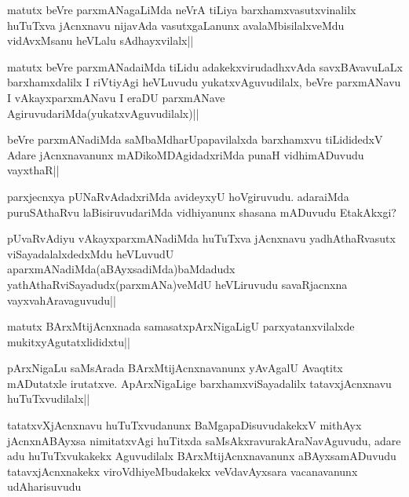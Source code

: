 \begin{artha}
matutx beVre parxmANagaLiMda neVrA tiLiya barxhamxvasutxvinalilx huTuTxva jAcnxnavu nijavAda vasutxgaLanunx avalaMbisilalxveMdu vidAvxMsanu heVLalu sAdhayxvilalx||
\end{artha}


\begin{artha}
matutx beVre parxmANadaiMda tiLidu adakekxvirudadhxvAda savxBAvavuLaLx barxhamxdalilx I riVtiyAgi heVLuvudu yukatxvAguvudilalx, beVre parxmANavu I vAkayxparxmANavu I eraDU parxmANave AgiruvudariMda(yukatxvAguvudilalx)||
\end{artha}

\begin{artha}
beVre parxmANadiMda saMbaMdharUpapavilalxda barxhamxvu tiLididedxV Adare jAcnxnavanunx mADikoMDAgidadxriMda punaH vidhimADuvudu vayxthaR||
\end{artha}


\begin{artha}
parxjecnxya pUNaRvAdadxriMda avideyxyU hoVgiruvudu. adaraiMda puruSAthaRvu laBisiruvudariMda vidhiyanunx shasana mADuvudu EtakAkxgi?
\end{artha}


\begin{artha}
pUvaRvAdiyu vAkayxparxmANadiMda huTuTxva jAcnxnavu yadhAthaRvasutx viSayadalalxdedxMdu heVLuvudU aparxmANadiMda(aBAyxsadiMda)baMdadudx yathAthaRviSayadudx(parxmANa)veMdU heVLiruvudu savaRjacnxna vayxvahAravaguvudu||
\end{artha}


\begin{artha}
matutx BArxMtijAcnxnada samasatxpArxNigaLigU parxyatanxvilalxde mukitxyAgutatxlididxtu||
\end{artha}

\begin{artha}
pArxNigaLu saMsArada BArxMtijAcnxnavanunx yAvAgalU Avaqtitx mADutatxle irutatxve. ApArxNigaLige barxhamxviSayadalilx tatavxjAcnxnavu huTuTxvudilalx||
\end{artha}

\begin{artha}
tatatxvXjAcnxnavu huTuTxvudanunx BaMgapaDisuvudakekxV mithAyx jAcnxnABAyxsa nimitatxvAgi huTitxda saMsAkxravurakAraNavAguvudu, adare adu huTuTxvukakekx Aguvudilalx BArxMtijAcnxnavanunx aBAyxsamADuvudu tatavxjAcnxnakekx viroVdhiyeMbudakekx veVdavAyxsara vacanavanunx udAharisuvudu
\end{artha}

